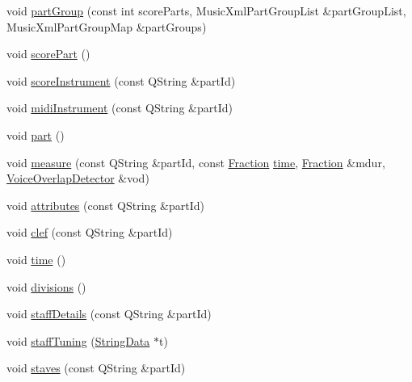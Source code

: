 \begin{DoxyCompactItemize}
\item 
void \hyperlink{class_ms_1_1_music_x_m_l_parser_pass1_a5a2df24d7b9d1d37082d3cb3db296f89}{part\+Group} (const int score\+Parts, Music\+Xml\+Part\+Group\+List \&part\+Group\+List, Music\+Xml\+Part\+Group\+Map \&part\+Groups)
\item 
void \hyperlink{class_ms_1_1_music_x_m_l_parser_pass1_ae3c3601c23c0d57e2aa568ca88c06aec}{score\+Part} ()
\item 
void \hyperlink{class_ms_1_1_music_x_m_l_parser_pass1_a463938c0965929d3e138ef1ee23f6196}{score\+Instrument} (const Q\+String \&part\+Id)
\item 
void \hyperlink{class_ms_1_1_music_x_m_l_parser_pass1_a62c10a3dbdfa48e117da30d553edcbcb}{midi\+Instrument} (const Q\+String \&part\+Id)
\item 
void \hyperlink{class_ms_1_1_music_x_m_l_parser_pass1_a50e05b33caec82874456b7ea0c6a8eeb}{part} ()
\item 
void \hyperlink{class_ms_1_1_music_x_m_l_parser_pass1_a06fb8196bef4664168ea4f3f3815c4c4}{measure} (const Q\+String \&part\+Id, const \hyperlink{class_ms_1_1_fraction}{Fraction} \hyperlink{class_ms_1_1_music_x_m_l_parser_pass1_abb54ab145dbe05ccc4ef4a04ca0d94bd}{time}, \hyperlink{class_ms_1_1_fraction}{Fraction} \&mdur, \hyperlink{class_ms_1_1_voice_overlap_detector}{Voice\+Overlap\+Detector} \&vod)
\item 
void \hyperlink{class_ms_1_1_music_x_m_l_parser_pass1_a39d323cd2ce91f10d41b1b5938bd3fab}{attributes} (const Q\+String \&part\+Id)
\item 
void \hyperlink{class_ms_1_1_music_x_m_l_parser_pass1_aaca33f48b413fe218783791896099fa8}{clef} (const Q\+String \&part\+Id)
\item 
void \hyperlink{class_ms_1_1_music_x_m_l_parser_pass1_abb54ab145dbe05ccc4ef4a04ca0d94bd}{time} ()
\item 
void \hyperlink{class_ms_1_1_music_x_m_l_parser_pass1_a9f1903385cb6f43c9aab41891125ed17}{divisions} ()
\item 
void \hyperlink{class_ms_1_1_music_x_m_l_parser_pass1_ae6bb7941967664f45789078847af96c4}{staff\+Details} (const Q\+String \&part\+Id)
\item 
void \hyperlink{class_ms_1_1_music_x_m_l_parser_pass1_aad4c7fa1b28dbc496956380e11dfe20a}{staff\+Tuning} (\hyperlink{class_ms_1_1_string_data}{String\+Data} $\ast$t)
\item 
void \hyperlink{class_ms_1_1_music_x_m_l_parser_pass1_aa8bbcc91b95c528dde2fa09e873393cc}{staves} (const Q\+String \&part\+Id)
\item 

\end{DoxyCompactItemize}
